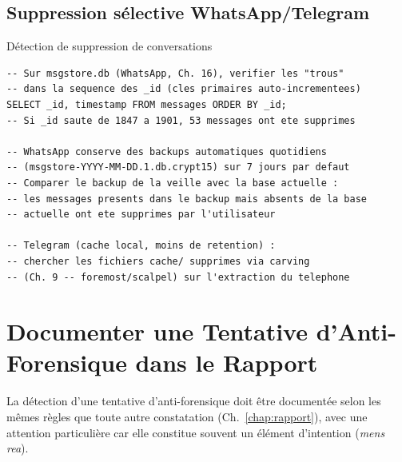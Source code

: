 \subsection{Suppression sélective WhatsApp/Telegram}

\begin{boxoutils}{Détection de suppression de conversations}
\begin{lstlisting}[language=bash_forensique]
-- Sur msgstore.db (WhatsApp, Ch. 16), verifier les "trous"
-- dans la sequence des _id (cles primaires auto-incrementees)
SELECT _id, timestamp FROM messages ORDER BY _id;
-- Si _id saute de 1847 a 1901, 53 messages ont ete supprimes

-- WhatsApp conserve des backups automatiques quotidiens
-- (msgstore-YYYY-MM-DD.1.db.crypt15) sur 7 jours par defaut
-- Comparer le backup de la veille avec la base actuelle :
-- les messages presents dans le backup mais absents de la base
-- actuelle ont ete supprimes par l'utilisateur

-- Telegram (cache local, moins de retention) :
-- chercher les fichiers cache/ supprimes via carving
-- (Ch. 9 -- foremost/scalpel) sur l'extraction du telephone
\end{lstlisting}
\end{boxoutils}

\section{Documenter une Tentative d'Anti-Forensique dans le Rapport}
\label{sec:documentation-anti-for}

La détection d'une tentative d'anti-forensique doit être documentée
selon les mêmes règles que toute autre constatation
(Ch.~\ref{chap:rapport}), avec une attention particulière car
elle constitue souvent un élément d'intention (\textit{mens rea}).

